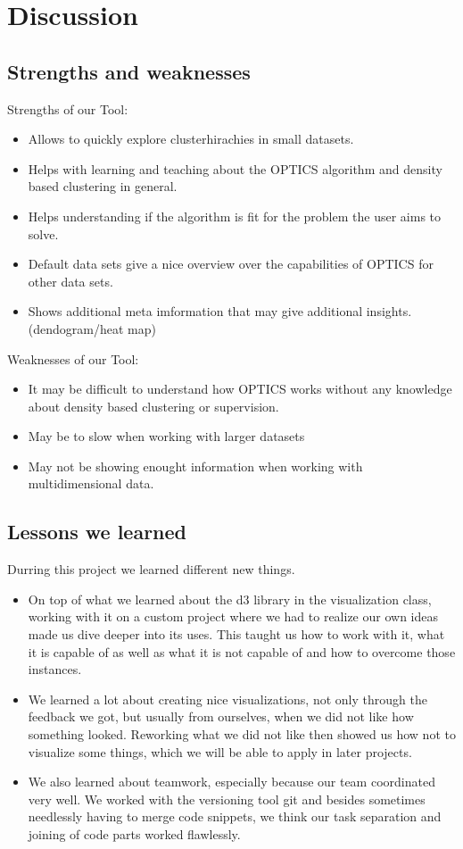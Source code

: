\documentclass{vgtc}                          %
\begin{document}
\section{Discussion}

\subsection{Strengths and weaknesses}
Strengths of our Tool:
\begin{itemize}
\item Allows to quickly explore clusterhirachies in small datasets.
\item Helps with learning and teaching about the OPTICS algorithm and density based clustering in general.
\item Helps understanding if the algorithm is fit for the problem the user aims to solve.
\item Default data sets give a nice overview over the capabilities of OPTICS for other data sets.
\item Shows additional meta imformation that may give additional insights. (dendogram/heat map)
\end{itemize}
Weaknesses of our Tool:
\begin{itemize}
\item It may be difficult to understand how OPTICS works without any knowledge about density based clustering or supervision.
\item May be to slow when working with larger datasets
\item May not be showing enought information when working with multidimensional data.
\end{itemize}
\subsection{Lessons we learned}
\begin{flushleft}
Durring this project we learned different new things.
\end{flushleft}
\begin{itemize}
\item On top of what we learned about the d3 library in the visualization class, working with it on a custom project where we had to realize our own ideas made us dive deeper into its uses. This taught us how to work with it, what it is capable of as well as what it is not capable of and how to overcome those instances.
\item We learned a lot about creating nice visualizations, not only through the feedback we got, but usually from ourselves, when we did not like how something looked. Reworking what we did not like then showed us how not to visualize some things, which we will be able to apply in later projects.
\item We also learned about teamwork, especially because our team coordinated very well. We worked with the versioning tool git and besides sometimes needlessly having to merge code snippets, we think our task separation and joining of code parts worked flawlessly.
\end{itemize}
\end{document}
